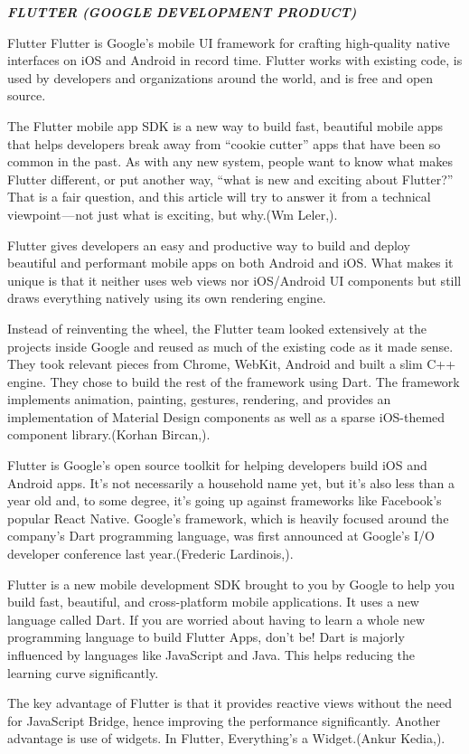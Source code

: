 \documentclass[11pt]{article}
\begin{document}
\begin{center}
\emph{\textbf{\textit{FLUTTER (GOOGLE DEVELOPMENT PRODUCT)}}}
\end{center}
Flutter
Flutter is Google’s mobile UI framework for crafting high-quality native interfaces on iOS and Android in record time. Flutter works with existing code, is used by developers and organizations around the world, and is free and open source.

The Flutter mobile app SDK is a new way to build fast, beautiful mobile apps that helps developers break away from “cookie cutter” apps that have been so common in the past.
As with any new system, people want to know what makes Flutter different, or put another way, “what is new and exciting about Flutter?” That is a fair question, and this article will try to answer it from a technical viewpoint — not just what is exciting, but why.(Wm Leler,\cite{Leler}).

Flutter gives developers an easy and productive way to build and deploy beautiful and performant mobile apps on both Android and iOS. What makes it unique is that it neither uses web views nor iOS/Android UI components but still draws everything natively using its own rendering engine.

Instead of reinventing the wheel, the Flutter team looked extensively at the projects inside Google and reused as much of the existing code as it made sense. They took relevant pieces from Chrome, WebKit, Android and built a slim C++ engine. They chose to build the rest of the framework using Dart. The framework implements animation, painting, gestures, rendering, and provides an implementation of Material Design components as well as a sparse iOS-themed component library.(Korhan Bircan,\cite{Korhan}).

Flutter is Google’s open source toolkit for helping developers build iOS and Android apps. It’s not necessarily a household name yet, but it’s also less than a year old and, to some degree, it’s going up against frameworks like Facebook’s popular React Native. Google’s framework, which is heavily focused around the company’s Dart programming language, was first announced at Google’s I/O developer conference last year.(Frederic Lardinois,\cite{Frederic}).

Flutter is a new mobile development SDK brought to you by Google to help you build fast, beautiful, and cross-platform mobile applications. It uses a new language called Dart. If you are worried about having to learn a whole new programming language to build Flutter Apps, don’t be! Dart is majorly influenced by languages like JavaScript and Java. This helps reducing the learning curve significantly.

The key advantage of Flutter is that it provides reactive views without the need for JavaScript Bridge, hence improving the performance significantly. Another advantage is use of widgets. In Flutter, Everything’s a Widget.(Ankur Kedia,\cite{Ankur}).





\end{document}
